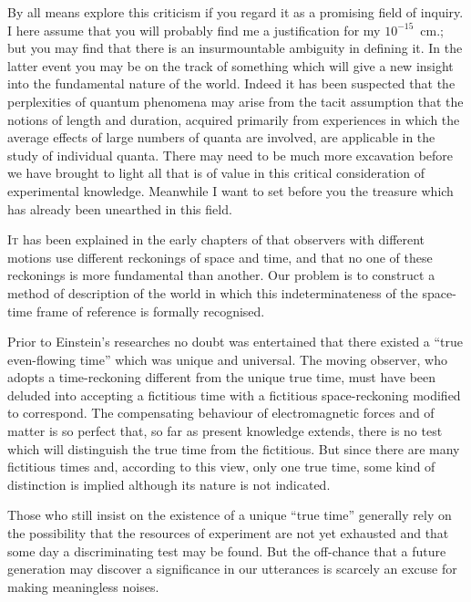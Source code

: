 \documentclass[12pt]{book}
\begin{document}
By all means explore this criticism if you regard it as a promising field
of inquiry. I here assume that you will probably find me a justification for
my $10^{-15}$~cm.; but you may find that there is an insurmountable ambiguity
in defining it. In the latter event you may be on the track of something
which will give a new insight into the fundamental nature of the world.
Indeed it has been suspected that the perplexities of quantum phenomena
may arise from the tacit assumption that the notions of length and duration,
acquired primarily from experiences in which the average effects of large
numbers of quanta are involved, are applicable in the study of individual
quanta. There may need to be much more excavation before we have brought
to light all that is of value in this critical consideration of experimental
knowledge. Meanwhile I want to set before you the treasure which has
already been unearthed in this field.



\lettrine{I}{t} has been explained in the early chapters of 
that observers with different motions use different reckonings of space and
time, and that no one of these reckonings is more fundamental than another.
Our problem is to construct a method of description of the world in which
this indeterminateness of the space-time frame of reference is formally
recognised.

Prior to Einstein's researches no doubt was entertained that there existed
a ``true even-flowing time'' which was unique and universal. The moving
observer, who adopts a time-reckoning different from the unique true time,
must have been deluded into accepting a fictitious time with a fictitious
space-reckoning modified to correspond. The compensating behaviour of
electromagnetic forces and of matter is so perfect that, so far as present
knowledge extends, there is no test which will distinguish the true time from
the fictitious. But since there are many fictitious times and, according to
this view, only one true time, some kind of distinction is implied although its
nature is not indicated.

Those who still insist on the existence of a unique ``true time'' generally
rely on the possibility that the resources of experiment are not yet exhausted
and that some day a discriminating test may be found. But the off-chance
that a future generation may discover a significance in our utterances is
scarcely an excuse for making meaningless noises.
\end{document}
